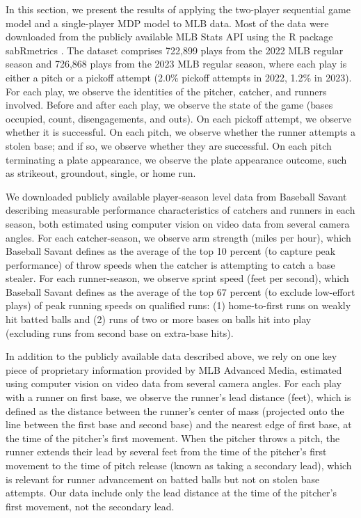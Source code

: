 \documentclass[11pt]{article}
\begin{document}
    In this section, we present the results of applying the two-player sequential game model and a single-player MDP model to MLB data. Most of the data were downloaded from the publicly available MLB Stats API using the R package sabRmetrics \parencite{powers_sabrmetrics_2025}. The dataset comprises 722,899 plays from the 2022 MLB regular season and 726,868 plays from the 2023 MLB regular season, where each play is either a pitch or a pickoff attempt (2.0\% pickoff attempts in 2022, 1.2\% in 2023). For each play, we observe the identities of the pitcher, catcher, and runners involved. Before and after each play, we observe the state of the game (bases occupied, count, disengagements, and outs). On each pickoff attempt, we observe whether it is successful. On each pitch, we observe whether the runner attempts a stolen base; and if so, we observe whether they are successful. On each pitch terminating a plate appearance, we observe the plate appearance outcome, such as strikeout, groundout, single, or home run.

    We downloaded publicly available player-season level data from Baseball Savant \parencite{baseball_savant_statcast_2024} describing measurable performance characteristics of catchers and runners in each season, both estimated using computer vision on video data from several camera angles. For each catcher-season, we observe arm strength (miles per hour), which Baseball Savant defines as the average of the top 10 percent (to capture peak performance) of throw speeds when the catcher is attempting to catch a base stealer. For each runner-season, we observe sprint speed (feet per second), which Baseball Savant defines as the average of the top 67 percent (to exclude low-effort plays) of peak running speeds on qualified runs: (1) home-to-first runs on weakly hit batted balls and (2) runs of two or more bases on balls hit into play (excluding runs from second base on extra-base hits).

    In addition to the publicly available data described above, we rely on one key piece of proprietary information provided by MLB Advanced Media, estimated using computer vision on video data from several camera angles. For each play with a runner on first base, we observe the runner's lead distance (feet), which is defined as the distance between the runner's center of mass (projected onto the line between the first base and second base) and the nearest edge of first base, at the time of the pitcher's first movement. When the pitcher throws a pitch, the runner extends their lead by several feet from the time of the pitcher's first movement to the time of pitch release (known as taking a secondary lead), which is relevant for runner advancement on batted balls but not on stolen base attempts. Our data include only the lead distance at the time of the pitcher's first movement, not the secondary lead.
\end{document}

